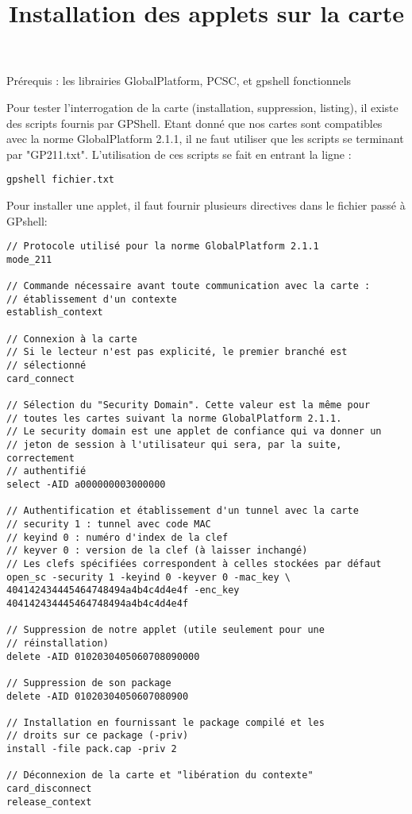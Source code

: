 \documentclass[a4paper,11pt,french]{article}
\title{Installation des applets sur la carte}
\begin{document}
\maketitle

Prérequis : les librairies GlobalPlatform, PCSC, et gpshell fonctionnels

Pour tester l'interrogation de la carte (installation, suppression,
listing), il existe des scripts fournis par GPShell. Etant donné que nos
cartes sont compatibles avec la norme GlobalPlatform 2.1.1, il ne faut utiliser
que les scripts se terminant par "GP211.txt".
L'utilisation de ces scripts se fait en entrant la ligne : 
\begin{verbatim}
gpshell fichier.txt
\end{verbatim}

Pour installer une applet, il faut fournir plusieurs directives dans le
fichier passé à GPshell:
\begin{verbatim}
// Protocole utilisé pour la norme GlobalPlatform 2.1.1
mode_211

// Commande nécessaire avant toute communication avec la carte :
// établissement d'un contexte
establish_context

// Connexion à la carte
// Si le lecteur n'est pas explicité, le premier branché est 
// sélectionné
card_connect

// Sélection du "Security Domain". Cette valeur est la même pour
// toutes les cartes suivant la norme GlobalPlatform 2.1.1.
// Le security domain est une applet de confiance qui va donner un
// jeton de session à l'utilisateur qui sera, par la suite, correctement
// authentifié
select -AID a000000003000000

// Authentification et établissement d'un tunnel avec la carte
// security 1 : tunnel avec code MAC 
// keyind 0 : numéro d'index de la clef
// keyver 0 : version de la clef (à laisser inchangé)
// Les clefs spécifiées correspondent à celles stockées par défaut
open_sc -security 1 -keyind 0 -keyver 0 -mac_key \
404142434445464748494a4b4c4d4e4f -enc_key 404142434445464748494a4b4c4d4e4f

// Suppression de notre applet (utile seulement pour une
// réinstallation)
delete -AID 0102030405060708090000                                              

// Suppression de son package
delete -AID 01020304050607080900                                                
                                                                                
// Installation en fournissant le package compilé et les
// droits sur ce package (-priv)
install -file pack.cap -priv 2
                                                                                
// Déconnexion de la carte et "libération du contexte"
card_disconnect          
release_context                                                                 

\end{verbatim}
\end{document}
